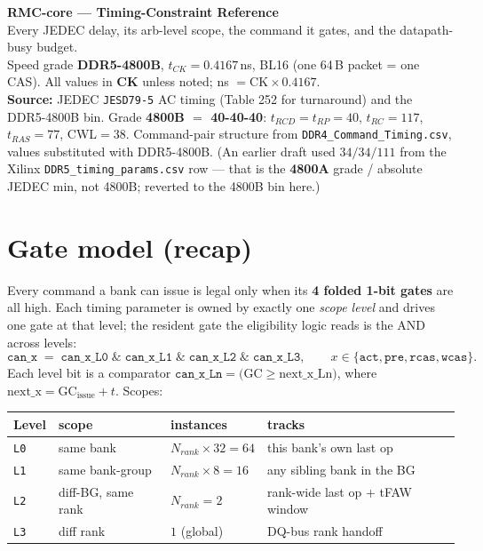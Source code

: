 \documentclass[10pt]{article}
\newcommand{\tck}{0.4167}
\newcommand{\p}[1]{\texttt{#1}}
\begin{document}
\begin{center}
{\Large\bfseries RMC-core — Timing-Constraint Reference}\\[3pt]
{\small\color{ff}Every JEDEC delay, its arb-level scope, the command it gates, and the
datapath-busy budget.\\
Speed grade \textbf{DDR5-4800B}, $t_{CK}=\tck$\,ns, BL16 (one 64\,B packet = one CAS).
All values in \textbf{CK} unless noted; ns $= \text{CK}\times\tck$.\\
\textbf{Source:} JEDEC \texttt{JESD79-5} AC timing (Table 252 for turnaround) and the DDR5-4800B
bin. Grade \textbf{4800B $=$ 40-40-40}: $t_{RCD}=t_{RP}=40$, $t_{RC}=117$, $t_{RAS}=77$, CWL$=38$.
Command-pair structure from \texttt{DDR4\_Command\_Timing.csv}, values substituted with DDR5-4800B.
(An earlier draft used $34/34/111$ from the Xilinx \texttt{DDR5\_timing\_params.csv} row --- that is
the \textbf{4800A} grade / absolute JEDEC min, not 4800B; reverted to the 4800B bin here.)}
\end{center}
\vspace{2pt}

\section{Gate model (recap)}
Every command a bank can issue is legal only when its \textbf{4 folded 1-bit gates} are all
high. Each timing parameter is owned by exactly one \emph{scope level} and drives one gate at
that level; the resident gate the eligibility logic reads is the AND across levels:
\[
\p{can\_x} \;=\; \p{can\_x\_L0}\;\&\;\p{can\_x\_L1}\;\&\;\p{can\_x\_L2}\;\&\;\p{can\_x\_L3},
\qquad x\in\{\p{act},\p{pre},\p{rcas},\p{wcas}\}.
\]
Each level bit is a comparator $\p{can\_x\_Ln} = \big(\text{GC} \ge \text{next\_x\_Ln}\big)$,
where $\text{next\_x} = \text{GC}_{\text{issue}} + t$. Scopes:

\begin{center}\small
\begin{tabular}{@{}l l l l@{}}
\toprule
\textbf{Level} & \textbf{scope} & \textbf{instances} & \textbf{tracks} \\
\midrule
\rowcolor{l0}\p{L0} & same bank            & $N_{rank}\!\times\!32=64$ & this bank's own last op \\
\rowcolor{l1}\p{L1} & same bank-group      & $N_{rank}\!\times\!8=16$  & any sibling bank in the BG \\
\rowcolor{l2}\p{L2} & diff-BG, same rank   & $N_{rank}=2$              & rank-wide last op + tFAW window \\
\rowcolor{l3}\p{L3} & diff rank            & $1$ (global)              & DQ-bus rank handoff \\
\bottomrule
\end{tabular}
\end{center}
\end{document}

